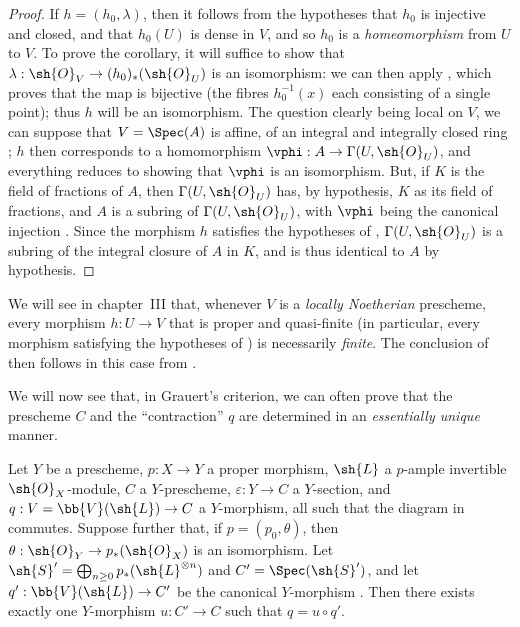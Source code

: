 \begin{proof}
If $h=(h_0,\lambda)$, then it follows from the hypotheses that $h_0$ is injective and closed, and that $h_0(U)$
is dense in $V$, and so $h_0$ is a \emph{homeomorphism} from $U$ to $V$.
To prove the corollary, it will suffice to show that $\lambda:\sh{O}_V\to(h_0)_*(\sh{O}_U)$ is an isomorphism: we can then apply , which proves that the map  is bijective (the fibres $h_0^{-1}(x)$ each consisting of a single point);
thus $h$ will be an isomorphism.
The question clearly being local on $V$, we can suppose that $V=\Spec(A)$ is affine, of an integral and integrally closed ring ;
$h$ then corresponds  to a homomorphism $\vphi:A\to\Gamma(U,\sh{O}_U)$, and everything reduces to showing that $\vphi$ is an isomorphism.
But, if $K$ is the field of fractions of $A$, then $\Gamma(U,\sh{O}_U)$ has, by hypothesis, $K$ as its field of fractions, and $A$ is a subring of $\Gamma(U,\sh{O}_U)$, with $\vphi$ being the canonical injection .
Since the morphism $h$ satisfies the hypotheses of , $\Gamma(U,\sh{O}_U)$ is a subring of the integral closure of $A$ in $K$, and is thus identical to $A$ by hypothesis.
\end{proof}

\begin{remark}[8.11.3]
\label{II.8.11.3}
We will see in chapter~III  that, whenever $V$ is a \emph{locally Noetherian} prescheme, every morphism $h:U\to V$ that is proper and quasi-finite (in particular, every morphism satisfying the hypotheses of ) is necessarily \emph{finite}.
The conclusion of  then follows in this case from .
\end{remark}

\begin{env}[8.11.4]
\label{II.8.11.4}
We will now see that, in Grauert's criterion, we can often prove that the prescheme $C$ and the ``contraction'' $q$ are determined in an \emph{essentially unique} manner.
\end{env}

\begin{lemma}[8.11.5]
\label{II.8.11.5}
Let $Y$ be a prescheme, $p:X\to Y$ a proper morphism, $\sh{L}$ a $p$-ample invertible $\sh{O}_X$-module, $C$ a $Y$-prescheme, $\varepsilon:Y\to C$ a $Y$-section, and $q:V=\bb{V}(\sh{L})\to C$ a $Y$-morphism, all such that the diagram in  commutes.
Suppose further that, if $p=(p_0,\theta)$, then $\theta:\sh{O}_Y\to p_*(\sh{O}_X)$ is an isomorphism.
Let $\sh{S}'=\bigoplus_{n\geq0}p_*(\sh{L}^{\otimes n})$ and $C'=\Spec(\sh{S}')$, and let $q':\bb{V}(\sh{L})\to C'$ be the canonical $Y$-morphism .
Then there exists exactly one $Y$-morphism $u:C'\to C$ such that $q=u\circ q'$.
\end{lemma}

